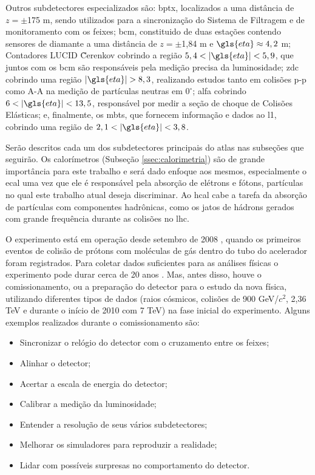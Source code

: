 Outros subdetectores especializados são: \gls{bptx}, localizados a uma distância
de $z = \pm$175 m, sendo utilizados para a sincronização do Sistema de Filtragem e de 
monitoramento com os feixes; \gls{bcm}, constituido de duas estações contendo
sensores de diamante a uma distância de $z = \pm$1,84 m e $\gls{eta} \approx
4,2$ m; Contadores LUCID \~Cerenkov cobrindo a região $5,4 < |\gls{eta}| < 5,9$, que
juntos com os \gls{bcm} são responsáveis pela medição precisa da luminosidade;
\gls{zdc} cobrindo uma região $|\gls{eta}|>8,3$, realizando estudos tanto em
colisões p-p como A-A na medição de partículas neutras em $0^{\circ}$;
\gls{alfa} cobrindo $6<|\gls{eta}|<13,5$, responsável por medir a seção de
choque de Colisões Elásticas; e, finalmente, os \gls{mbts}, que fornecem
informação e dados ao \glsdesc{l1}, cobrindo uma região de $2,1
< |\gls{eta}| < 3,8$.

Serão descritos cada um dos subdetectores principais do \gls{atlas} nas
subseções que seguirão. Os calorímetros (Subseção \ref{ssec:calorimetria}) são de grande importância 
para este trabalho e será dado enfoque aos mesmos, 
especialmente o \gls{ecal} uma vez que ele é responsável 
pela absorção de elétrons e fótons, partículas no qual este trabalho atual deseja
discriminar. Ao \gls{hcal} cabe a tarefa da absorção de partículas
com componentes hadrônicas, como os jatos de hádrons gerados com grande
frequência durante as colisões no \gls{lhc}.

O experimento está em operação desde setembro de 2008 \cite{webLHC},
quando os primeiros eventos de colisão de prótons com moléculas de gás dentro do tubo do acelerador
foram registrados. Para coletar dados suficientes para as análises físicas o
experimento pode durar cerca de 20 anos \cite{ATLAS_TDR}. Mas, antes disso, 
houve o comissionamento, ou a preparação do detector para o estudo da nova
física, utilizando diferentes tipos de dados (raios cósmicos, colisões de 900 GeV/$c^2$, 2,36
TeV e durante o início de 2010 com 7 TeV) na fase inicial do experimento. 
Alguns exemplos realizados durante o comissionamento são:

\begin{itemize}
\item Sincronizar o relógio do detector com o cruzamento entre os feixes;
\item Alinhar o detector;
\item Acertar a escala de energia do detector;
\item Calibrar a medição da luminosidade;
\item Entender a resolução de seus vários subdetectores;
\item Melhorar os simuladores para reproduzir a realidade;
\item Lidar com possíveis surpresas no comportamento do detector.
\end{itemize}

